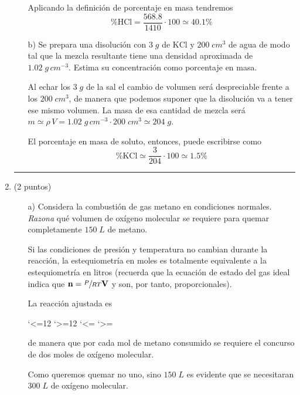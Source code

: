 \documentclass[a4paper,14pt]{extarticle}
\let\chold\ch
\renewcommand\ch[1]{%
    \catcode`<=12
    \catcode`>=12
    \chold{#1}%
    \catcode`<=\active
    \catcode`>=\active
}
\newcommand*\chem[1]{\ensuremath{\mathrm{#1}}}
\newcommand{\halmos}{
\vspace*{-1ex}

\begin{flushright}
\rule{1mm}{2.5mm} \end{flushright}
\vspace*{-1.5ex}

}
\renewcommand{\qed}{\halmos}
\begin{document}
\begin{enumerate}
\begin{itemize}
\begin{mdframed}[backgroundcolor=brown!10]
			Aplicando la definición de porcentaje en masa tendremos
			$$\%\chem{HCl}=\frac{568.8}{1410}\cdot 100\simeq 40.1\%$$
			\end{mdframed}
			\item[b)] Se prepara una disolución con $3\;g$ de $\chem{KCl}$ y $200\;cm^3$ de agua de modo tal que la mezcla resultante tiene una densidad aproximada de $1.02\;g\,cm^{-3}$. Estima su concentración como porcentaje en masa.
			\begin{mdframed}[backgroundcolor=brown!10]  
			Al echar los $3\;g$ de la sal el cambio de volumen será despreciable frente a los $200\;cm^3$, de manera que podemos suponer que la disolución va a tener ese mismo volumen. La masa de esa cantidad de mezcla será $m\simeq\rho\,V=1.02\;g\,cm^{-3}\cdot 200\;cm^3\simeq 204\;g.$
			
			El porcentaje en masa de soluto, entonces, puede escribirse como
			$$\%\chem{KCl}\simeq \frac{3}{204}\cdot 100\simeq 1.5\%$$
			\end{mdframed}
		\end{itemize}
    \qed
    
    \newpage
 
    \item (2 puntos)
    	\begin{itemize}
    		\item[a)] Considera la combustión de gas metano en condiciones normales. \textit{Razona} qué volumen de oxígeno molecular se requiere para quemar completamente $150\;L$ de metano.
    		\begin{mdframed}[backgroundcolor=brown!10]  
    		Si las condiciones de presión y temperatura no cambian durante la reacción, la estequiometría en moles es totalmente equivalente a la estequiometría en litros (recuerda que la ecuación de estado del gas ideal indica que $\mathbf{n}=\sfrac{P}{RT}\mathbf{V}$ y son, por tanto, proporcionales).
    		
    		La reacción ajustada es 
    		\begin{center}
    		\end{center} de manera que por cada mol de metano consumido se requiere el concurso de dos moles de oxígeno molecular. 
			    		
    		Como queremos quemar no uno, sino $150\;L$ es evidente que se necesitaran $300\;L$ de oxígeno molecular.


\end{mdframed}
\end{itemize}
\end{enumerate}
\end{document}
